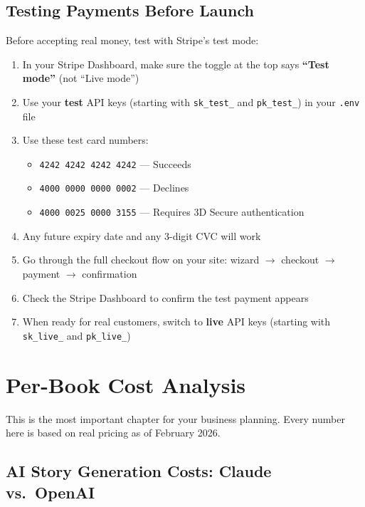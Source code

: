 \documentclass[12pt, letterpaper, oneside]{book}
\begin{document}
\section{Testing Payments Before Launch}

Before accepting real money, test with Stripe's test mode:

\begin{actionbox}
\begin{enumerate}[leftmargin=2em]
  \item In your Stripe Dashboard, make sure the toggle at the top says \textbf{``Test mode''} (not ``Live mode'')
  \item Use your \textbf{test} API keys (starting with \texttt{sk\_test\_} and \texttt{pk\_test\_}) in your \texttt{.env} file
  \item Use these test card numbers:
    \begin{itemize}[leftmargin=1.5em]
      \item \texttt{4242 4242 4242 4242} --- Succeeds
      \item \texttt{4000 0000 0000 0002} --- Declines
      \item \texttt{4000 0025 0000 3155} --- Requires 3D Secure authentication
    \end{itemize}
  \item Any future expiry date and any 3-digit CVC will work
  \item Go through the full checkout flow on your site: wizard $\rightarrow$ checkout $\rightarrow$ payment $\rightarrow$ confirmation
  \item Check the Stripe Dashboard to confirm the test payment appears
  \item When ready for real customers, switch to \textbf{live} API keys (starting with \texttt{sk\_live\_} and \texttt{pk\_live\_})
\end{enumerate}
\end{actionbox}

\chapter{Per-Book Cost Analysis}

This is the most important chapter for your business planning. Every number here is based on real pricing as of February 2026.

\section{AI Story Generation Costs: Claude vs.\ OpenAI}
\end{document}
